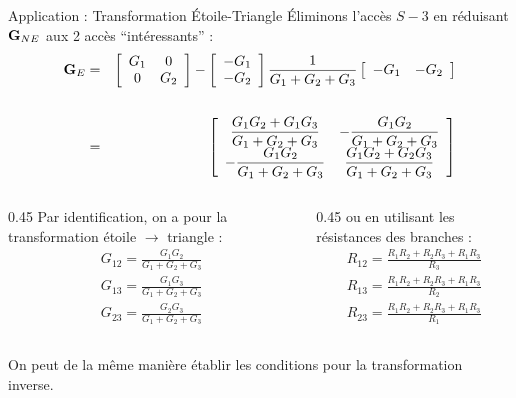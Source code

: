 \begin{frame}[allowframebreaks]{Application : Transformation Étoile-Triangle}
Éliminons l'accès $S-3$ en réduisant ${\bf G}_{NE}$ aux 2 accès
``intéressants'' : 
\begin{eqnarray*}
	{\bf G}_E &=&
	\left[
	\begin{array}{cc}
		G_1 & 0\\ 0 & G_2
	\end{array} \right] - \left[
	\begin{array}{c}
		-G_1 \\-G_2
	\end{array}\right] \frac{1}{G_1+G_2+G_3} \left[
	\begin{array}{cc}
		-G_1 & -G_2
	\end{array}\right] \\[6mm] & = & \left[ 
	\begin{array}{cc}\displaystyle 
		\frac{G_1G_2+G_1G_3}{G_1+G_2+G_3} & \displaystyle 
		-\frac{G_1G_2}{G_1+G_2+G_3}\\\displaystyle 
		-\frac{G_1G_2}{G_1+G_2+G_3} & \displaystyle \frac{G_1G_2+G_2G_3}{G_1+G_2+G_3} 
	\end{array}\right]
\end{eqnarray*}

\begin{columns}
  \begin{column}{0.45\textwidth}
    Par identification, on a  pour la transformation étoile $\rightarrow$ triangle :
    \[\begin{array}{c}
    G_{12}=\frac{G_1G_2}{G_1+G_2+G_3}\\[4mm]
    G_{13}=\frac{G_1G_3}{G_1+G_2+G_3}\\[4mm]
    G_{23}=\frac{G_2G_3}{G_1+G_2+G_3}
    \end{array}\]
  \end{column}
  \begin{column}{0.45\textwidth}
    ou en utilisant les résistances des branches : 
    \[\begin{array}{c}
    R_{12}=\frac{R_1R_2+R_2R_3+R_1R_3}{R_3}\\[4mm]
    R_{13}=\frac{R_1R_2+R_2R_3+R_1R_3}{R_2}\\[4mm]
    R_{23}=\frac{R_1R_2+R_2R_3+R_1R_3}{R_1}
    \end{array} \]
  \end{column}
\end{columns}
\vspace{\baselineskip}
On peut de la même manière établir les conditions pour la transformation inverse.

    
\end{frame}

